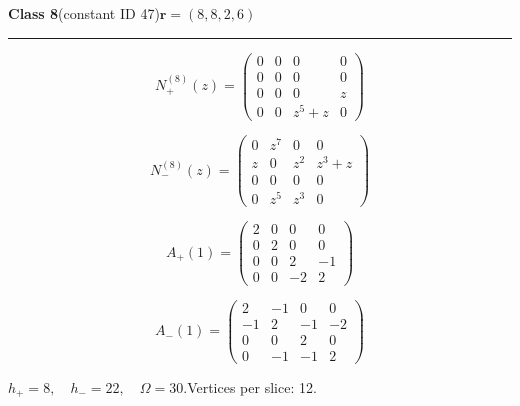 \noindent\begin{minipage}{\linewidth}
\noindent\textbf{Class 8}\quad\small (constant ID 47)\hfill $\symbf{r}=(8,8,2,6)$
\par\smallskip\noindent\textcolor{rulegray}{\rule{\linewidth}{0.3pt}}
\begin{minipage}[c]{0.495\linewidth}\centering\fontsize{9.7}{12}\selectfont
\setlength{\abovedisplayskip}{4pt}\setlength{\belowdisplayskip}{4pt}
\setlength{\abovedisplayshortskip}{4pt}\setlength{\belowdisplayshortskip}{4pt}
\setlength{\arraycolsep}{3pt}\renewcommand{\arraystretch}{1.08}
\[N_{+}^{(8)}(z)=\begin{pmatrix}0 & 0 & 0 & 0\\0 & 0 & 0 & 0\\0 & 0 & 0 & z\\0 & 0 & z^{5} + z & 0\end{pmatrix}\]
\end{minipage}%
\begin{minipage}[c]{0.495\linewidth}\centering\fontsize{9.7}{12}\selectfont
\setlength{\abovedisplayskip}{4pt}\setlength{\belowdisplayskip}{4pt}
\setlength{\abovedisplayshortskip}{4pt}\setlength{\belowdisplayshortskip}{4pt}
\setlength{\arraycolsep}{3pt}\renewcommand{\arraystretch}{1.08}
\[N_{-}^{(8)}(z)=\begin{pmatrix}0 & z^{7} & 0 & 0\\z & 0 & z^{2} & z^{3} + z\\0 & 0 & 0 & 0\\0 & z^{5} & z^{3} & 0\end{pmatrix}\]
\end{minipage}%
\par\noindent
\begin{minipage}[c]{0.495\linewidth}\centering\fontsize{9.7}{12}\selectfont
\setlength{\abovedisplayskip}{4pt}\setlength{\belowdisplayskip}{4pt}
\setlength{\abovedisplayshortskip}{4pt}\setlength{\belowdisplayshortskip}{4pt}
\setlength{\arraycolsep}{3pt}\renewcommand{\arraystretch}{1.08}
\[A_{+}(1)=\begin{pmatrix}2 & 0 & 0 & 0\\0 & 2 & 0 & 0\\0 & 0 & 2 & -1\\0 & 0 & -2 & 2\end{pmatrix}\]
\end{minipage}%
\begin{minipage}[c]{0.495\linewidth}\centering\fontsize{9.7}{12}\selectfont
\setlength{\abovedisplayskip}{4pt}\setlength{\belowdisplayskip}{4pt}
\setlength{\abovedisplayshortskip}{4pt}\setlength{\belowdisplayshortskip}{4pt}
\setlength{\arraycolsep}{3pt}\renewcommand{\arraystretch}{1.08}
\[A_{-}(1)=\begin{pmatrix}2 & -1 & 0 & 0\\-1 & 2 & -1 & -2\\0 & 0 & 2 & 0\\0 & -1 & -1 & 2\end{pmatrix}\]
\end{minipage}%
\par\smallskip\noindent\small $h_+=8,\quad h_-=22,\quad \Omega=30.$\quad Vertices per slice: 12.
\end{minipage}\par\vfill
\clearpage
